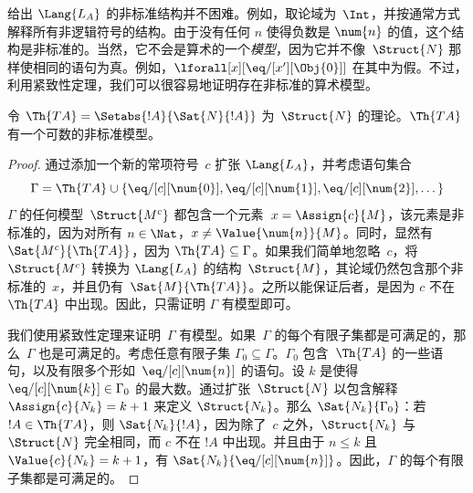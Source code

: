 \documentclass[../../../include/open-logic-section]{subfiles}
\begin{document}
\begin{explain}
给出 $\Lang{L_A}$ 的非标准结构并不困难。例如，取论域为~$\Int$，并按通常方式解释所有非逻辑符号的结构。由于没有任何 $n$ 使得负数是 $\num{n}$ 的值，这个结构是非标准的。当然，它不会是算术的一个\emph{模型}，因为它并不像~$\Struct{N}$ 那样使相同的语句为真。例如，$\lforall[x][\eq/[x'][\Obj{0}]]$ 在其中为假。不过，利用紧致性定理，我们可以很容易地证明存在非标准的算术模型。
\end{explain}

\begin{prop}
令 $\Th{TA} = \Setabs{!A}{\Sat{N}{!A}}$ 为~$\Struct{N}$ 的理论。$\Th{TA}$ 有一个可数的非标准模型。
\end{prop}

\begin{proof}
通过添加一个新的常项符号~$c$ 扩张 $\Lang{L_A}$，并考虑语句集合
\[
\Gamma = \Th{TA} \cup \{\eq/[c][\num{0}], \eq/[c][\num{1}],
\eq/[c][\num{2}], \dots\}
\]
$\Gamma$ 的任何模型~$\Struct{M^c}$ 都包含一个元素~$x = \Assign{c}{M}$，该元素是非标准的，因为对所有 $n \in \Nat$，$x \neq
\Value{\num{n}}{M}$。同时，显然有 $\Sat{M^c}{\Th{TA}}$，因为 $\Th{TA} \subseteq \Gamma$。如果我们简单地忽略~$c$，将 $\Struct{M^c}$ 转换为 $\Lang{L_A}$ 的结构~$\Struct{M}$，其论域仍然包含那个非标准的~$x$，并且仍有~$\Sat{M}{\Th{TA}}$。之所以能保证后者，是因为 $c$ 不在~$\Th{TA}$ 中出现。因此，只需证明 $\Gamma$ 有模型即可。

我们使用紧致性定理来证明~$\Gamma$ 有模型。如果~$\Gamma$ 的每个有限子集都是可满足的，那么~$\Gamma$ 也是可满足的。考虑任意有限子集 $\Gamma_0 \subseteq \Gamma$。$\Gamma_0$ 包含~$\Th{TA}$ 的一些语句，以及有限多个形如~$\eq/[c][\num{n}]$ 的语句。设 $k$ 是使得 $\eq/[c][\num{k}] \in \Gamma_0$ 的最大数。通过扩张~$\Struct{N}$ 以包含解释~$\Assign{c}{N_k} = k+1$ 来定义 $\Struct{N_k}$。那么 $\Sat{N_k}{\Gamma_0}$：若 $!A \in \Th{TA}$，则 $\Sat{N_k}{!A}$，因为除了~$c$ 之外，$\Struct{N_k}$ 与~$\Struct{N}$ 完全相同，而 $c$ 不在 $!A$ 中出现。并且由于 $n \le k$ 且 $\Value{c}{N_k} = k+1$，有 $\Sat{N_k}{\eq/[c][\num{n}]}$。因此，$\Gamma$ 的每个有限子集都是可满足的。
\end{proof}
\end{document}
